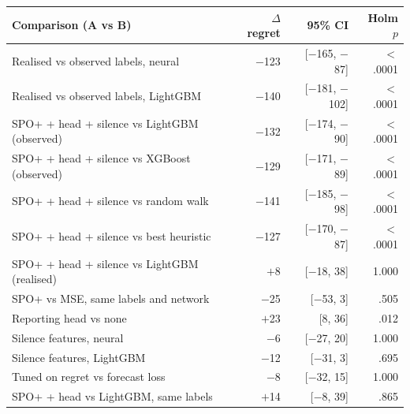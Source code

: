 \begin{tabular}{lrrr}
\toprule
Comparison (A vs B) & $\Delta$ regret & 95\% CI & Holm $p$\\
\midrule
Realised vs observed labels, neural & $-$123 & [$-$165, $-$87] & $<$.0001\\
Realised vs observed labels, LightGBM & $-$140 & [$-$181, $-$102] & $<$.0001\\
SPO+ + head + silence vs LightGBM (observed) & $-$132 & [$-$174, $-$90] & $<$.0001\\
SPO+ + head + silence vs XGBoost (observed) & $-$129 & [$-$171, $-$89] & $<$.0001\\
SPO+ + head + silence vs random walk & $-$141 & [$-$185, $-$98] & $<$.0001\\
SPO+ + head + silence vs best heuristic & $-$127 & [$-$170, $-$87] & $<$.0001\\
SPO+ + head + silence vs LightGBM (realised) & $+$8 & [$-$18, 38] & 1.000\\
SPO+ vs MSE, same labels and network & $-$25 & [$-$53, 3] & .505\\
Reporting head vs none & $+$23 & [8, 36] & .012\\
Silence features, neural & $-$6 & [$-$27, 20] & 1.000\\
Silence features, LightGBM & $-$12 & [$-$31, 3] & .695\\
Tuned on regret vs forecast loss & $-$8 & [$-$32, 15] & 1.000\\
SPO+ + head vs LightGBM, same labels & $+$14 & [$-$8, 39] & .865\\
\bottomrule
\end{tabular}